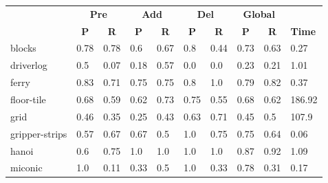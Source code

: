 \begin{table}[hbt!]
	\begin{center}
		
		\begin{tabular}{l|l|l|l|l|l|l||l|l|l|}
			& \multicolumn{2}{|c|}{\bf Pre} & \multicolumn{2}{|c|}{\bf Add} & \multicolumn{2}{|c||}{\bf Del} & \multicolumn{2}{|c|}{\bf Global} & \\ \cline{2-9}			
			& \multicolumn{1}{|c|}{\bf P} & \multicolumn{1}{|c|}{\bf R} & \multicolumn{1}{|c|}{\bf P} & \multicolumn{1}{|c|}{\bf R} & \multicolumn{1}{|c|}{\bf P} & \multicolumn{1}{|c||}{\bf R} &  \multicolumn{1}{|c|}{\bf P} & \multicolumn{1}{|c|}{\bf R} & {\bf Time} \\
			\hline
			blocks & 0.78 & 0.78 & 0.6 & 0.67 & 0.8 & 0.44 & 0.73 & 0.63& 0.27 \\ %
			driverlog & 0.5 & 0.07 & 0.18 & 0.57 & 0.0 & 0.0 & 0.23 & 0.21& 1.01 \\ %
			ferry & 0.83 & 0.71 & 0.75 & 0.75 & 0.8 & 1.0 & 0.79 & 0.82& 0.37 \\ %
			floor-tile & 0.68 & 0.59 & 0.62 & 0.73 & 0.75 & 0.55 & 0.68 & 0.62& 186.92 \\ %
			grid & 0.46 & 0.35 & 0.25 & 0.43 & 0.63 & 0.71 & 0.45 & 0.5& 107.9 \\ %
			gripper-strips & 0.57 & 0.67 & 0.67 & 0.5 & 1.0 & 0.75 & 0.75 & 0.64& 0.06 \\ %
			hanoi & 0.6 & 0.75 & 1.0 & 1.0 & 1.0 & 1.0 & 0.87 & 0.92& 1.09 \\ %
			miconic & 1.0 & 0.11 & 0.33 & 0.5 & 1.0 & 0.33 & 0.78 & 0.31& 0.17 \\ %

\end{tabular}
\end{center}
\end{table}
